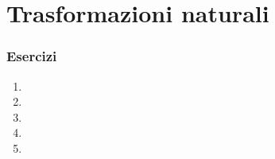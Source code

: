\section{Trasformazioni naturali}

\subsubsection*{Esercizi}
\begin{enumerate}
    \item
    \item
    \item
    \item
    \item
\end{enumerate}
